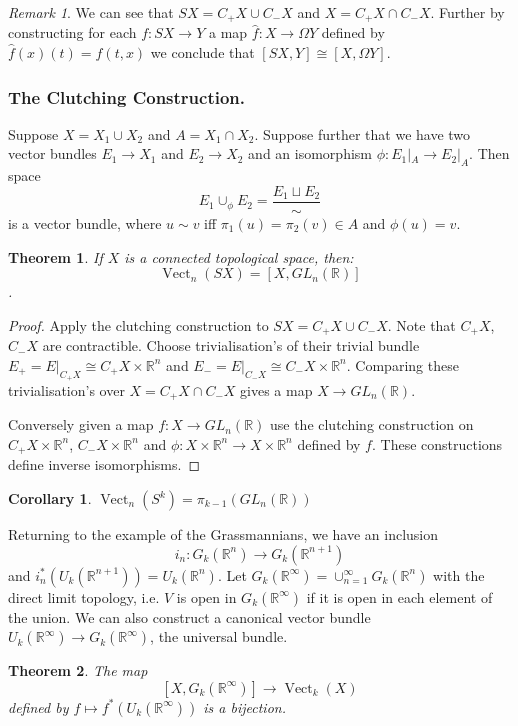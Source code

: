 \documentclass[a4paper,10pt]{article}
\theoremstyle{plain}%
\newtheorem{thm}{Theorem}
\newtheorem{cor}{Corollary}
\theoremstyle{definition}
\theoremstyle{remark}
\newtheorem{rem}{Remark}
\newcommand{\RR}{\mathbb{R}}
\DeclareMathOperator{\Vect}{Vect}
\begin{document}
\begin{rem}We can see that $SX = C_+X\cup C_- X$ and $X = C_+X\cap C_- X$. Further by constructing for each $f: SX\to Y$ a map $\hat{f}:X\to \Omega Y$ defined by $\hat{f}(x)(t)= f(t,x)$ we conclude that $[SX,Y]\cong [X,\Omega Y]$.
\end{rem}

\subsubsection{The Clutching Construction.}

Suppose $X = X_1 \cup X_2$ and $A= X_1 \cap X_2$. Suppose further that we have two vector bundles $E_1\to X_1$ and $E_2\to X_2$ and an isomorphism $\phi: E_1|_A \to E_2|_A.$
Then space 
\[
E_1\cup_\phi E_2 = \frac{E_1\sqcup E_2}{\sim}
\] 
is a vector bundle, where $u\sim v$ iff $\pi_1(u) = \pi_2(v)\in A$ and $\phi(u)=v$.

\begin{thm}
If $X$ is a connected topological space, then: 
$$\Vect_n(SX) = [X, GL_n(\RR)]$$.
\end{thm}

\begin{proof} Apply the clutching construction to $SX = C_+X\cup C_- X$. Note that $C_+ X$, $C_-X$ are contractible. Choose trivialisation's of their trivial bundle $E_+ = E |_{C_+X}\cong C_+X\times \RR^n$ and $E_- = E |_{C_-X}\cong C_-X\times \RR^n.$ Comparing these trivialisation's over $X = C_+X\cap C_- X$ gives a map $X\to GL_n(\RR).$

Conversely given a map $f:X\to GL_n(\RR)$ use the clutching construction on $C_+X\times \RR^n$, $C_-X\times \RR^n$ and $\phi:X\times \RR^n\to X\times\RR^n$ defined by $f$. These constructions define inverse isomorphisms.\end{proof}

\begin{cor}
$\Vect_n(S^ k) =  \pi_{k-1}(GL_n(\RR))$
\end{cor}

Returning to the example of the Grassmannians, we have an inclusion
\[ 
i_n:G_k(\RR^n)\to G_k(\RR^{n+1})
\]
and $i_n^*(U_k(\RR^{n+1}))= U_k(\RR^n).$ Let $G_k(\RR^\infty) = \cup_{n=1}^\infty G_k(\RR^n)$ with the direct limit topology, i.e. $V$ is open in $G_k(\RR^\infty)$ if it is open in each element of the union. We can also construct a canonical vector bundle $U_k(\RR^\infty)\to G_k(\RR^\infty)$, the universal bundle.

\begin{thm}
The map
\[
[X,G_k(\RR^\infty)]\to \Vect_k(X)
\] defined by $f\mapsto f^*(U_k(\RR^\infty))$ is a bijection.
\end{thm}
\end{document}
